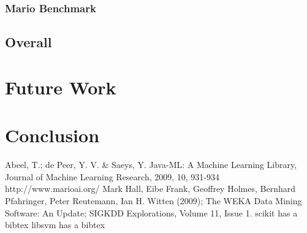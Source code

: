 \documentclass[]{article}   %
\begin{document}
\subsubsection{Mario Benchmark}

\subsection{Overall}

\section{Future Work}

\section{Conclusion}


\begin{thebibliography}{9}
  Abeel, T.; de Peer, Y. V. \& Saeys, Y. Java-ML: A Machine Learning Library, Journal of Machine Learning Research, 2009, 10, 931-934
  http://www.marioai.org/
  Mark Hall, Eibe Frank, Geoffrey Holmes, Bernhard Pfahringer, Peter Reutemann, Ian H. Witten (2009); The WEKA Data Mining Software: An Update; SIGKDD Explorations, Volume 11, Issue 1.
  scikit has a bibtex
  libsvm has a bibtex
\end{thebibliography}
\end{document}
